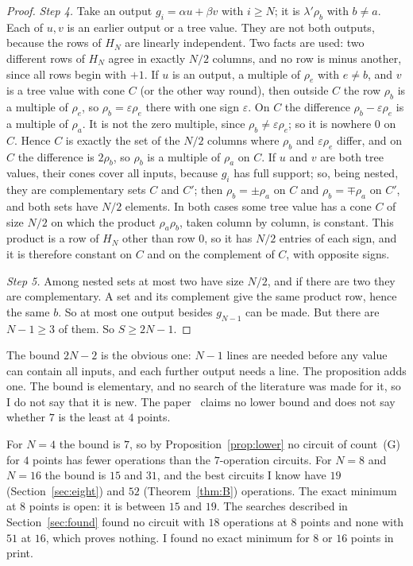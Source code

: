 \documentclass[10pt]{article}
\theoremstyle{remark}
\newcommand{\cntG}{\textup{(G)}}
\begin{document}
\begin{proof}
\emph{Step 4.} Take an output $g_i=\alpha u+\beta v$ with $i\ge N$; it is $\lambda'\rho_b$ with $b\ne a$. Each
of $u,v$ is an earlier output or a tree value. They are not both outputs, because the rows of $H_N$ are
linearly independent. Two facts are used: two different rows of $H_N$ agree in exactly $N/2$ columns, and
no row is minus another, since all rows begin with $+1$.
If $u$ is an output, a multiple of $\rho_e$ with $e\ne b$, and $v$ is a tree value with cone $C$ (or the
other way round), then outside
$C$ the row $\rho_b$ is a multiple of $\rho_e$, so $\rho_b=\varepsilon\rho_e$ there with one sign
$\varepsilon$. On $C$ the difference $\rho_b-\varepsilon\rho_e$ is a multiple of $\rho_a$. It is not the zero
multiple, since $\rho_b\ne\varepsilon\rho_e$; so it is nowhere $0$ on $C$. Hence $C$ is exactly the set of the
$N/2$ columns where $\rho_b$ and $\varepsilon\rho_e$ differ, and on $C$ the difference is $2\rho_b$, so $\rho_b$
is a multiple of $\rho_a$ on $C$.
If $u$ and $v$ are both tree values, their cones cover all inputs, because $g_i$ has full support; so,
being nested, they are complementary
sets $C$ and $C'$; then $\rho_b=\pm\rho_a$ on $C$ and $\rho_b=\mp\rho_a$ on $C'$, and both sets have $N/2$
elements.
In both cases some tree value has a cone $C$ of size $N/2$ on which the product $\rho_a\rho_b$, taken column
by column, is constant. This product is a row of $H_N$ other than row $0$, so it has $N/2$ entries of each
sign, and it is therefore constant on $C$ and on the complement of $C$, with opposite signs.

\emph{Step 5.} Among nested sets at most two have size $N/2$, and if there are two they are complementary.
A set and its complement give the same product row, hence the same $b$. So at most one output besides
$g_{N-1}$ can be made. But there are $N-1\ge3$ of them. So $S\ge 2N-1$.
\end{proof}

The bound $2N-2$ is the obvious one: $N-1$ lines are needed before any value can contain all inputs, and
each further output needs a line. The proposition adds one. The bound is elementary, and no search of the
literature was made for it, so I do not say that it is new. The paper~\cite{CFL} claims no lower bound and
does not say whether $7$ is the least at $4$ points.

For $N=4$ the bound is $7$, so by Proposition~\ref{prop:lower} no circuit of count~\cntG{} for $4$ points has
fewer operations than the $7$-operation circuits. For $N=8$ and $N=16$ the bound
is $15$ and $31$, and the best circuits I know have $19$ (Section~\ref{sec:eight}) and $52$
(Theorem~\ref{thm:B}) operations.
The exact minimum at $8$ points is open: it is between $15$ and $19$. The searches described in
Section~\ref{sec:found} found no circuit with $18$ operations at $8$ points and none with $51$ at $16$, which
proves nothing. I found no exact minimum for $8$ or $16$ points in print.
\end{document}
